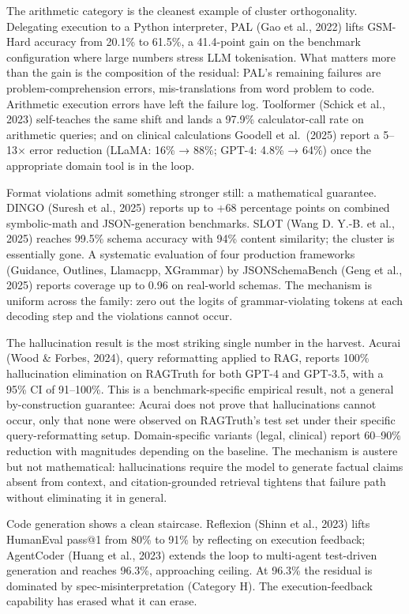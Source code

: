 \documentclass[
]{article}
\newcounter{none} %
\begin{document}
The arithmetic category is the cleanest example of cluster
orthogonality. Delegating execution to a Python interpreter, PAL (Gao et
al., 2022) lifts GSM-Hard accuracy from 20.1\% to 61.5\%, a 41.4-point
gain on the benchmark configuration where large numbers stress LLM
tokenisation. What matters more than the gain is the composition of the
residual: PAL's remaining failures are problem-comprehension errors,
mis-translations from word problem to code. Arithmetic execution errors
have left the failure log. Toolformer (Schick et al., 2023) self-teaches
the same shift and lands a 97.9\% calculator-call rate on arithmetic
queries; and on clinical calculations Goodell et al.~(2025) report a
5--13× error reduction (LLaMA: 16\% → 88\%; GPT-4: 4.8\% → 64\%) once
the appropriate domain tool is in the loop.

Format violations admit something stronger still: a mathematical
guarantee. DINGO (Suresh et al., 2025) reports up to +68 percentage
points on combined symbolic-math and JSON-generation benchmarks. SLOT
(Wang D. Y.-B. et al., 2025) reaches 99.5\% schema accuracy with 94\%
content similarity; the cluster is essentially gone. A systematic
evaluation of four production frameworks (Guidance, Outlines, Llamacpp,
XGrammar) by JSONSchemaBench (Geng et al., 2025) reports coverage up to
0.96 on real-world schemas. The mechanism is uniform across the family:
zero out the logits of grammar-violating tokens at each decoding step
and the violations cannot occur.

The hallucination result is the most striking single number in the
harvest. Acurai (Wood \& Forbes, 2024), query reformatting applied to
RAG, reports 100\% hallucination elimination on RAGTruth for both GPT-4
and GPT-3.5, with a 95\% CI of 91--100\%. This is a benchmark-specific
empirical result, not a general by-construction guarantee: Acurai does
not prove that hallucinations cannot occur, only that none were observed
on RAGTruth's test set under their specific query-reformatting setup.
Domain-specific variants (legal, clinical) report 60--90\% reduction
with magnitudes depending on the baseline. The mechanism is austere but
not mathematical: hallucinations require the model to generate factual
claims absent from context, and citation-grounded retrieval tightens
that failure path without eliminating it in general.

Code generation shows a clean staircase. Reflexion (Shinn et al., 2023)
lifts HumanEval pass@1 from 80\% to 91\% by reflecting on execution
feedback; AgentCoder (Huang et al., 2023) extends the loop to
multi-agent test-driven generation and reaches 96.3\%, approaching
ceiling. At 96.3\% the residual is dominated by spec-misinterpretation
(Category H). The execution-feedback capability has erased what it can
erase.
\end{document}
